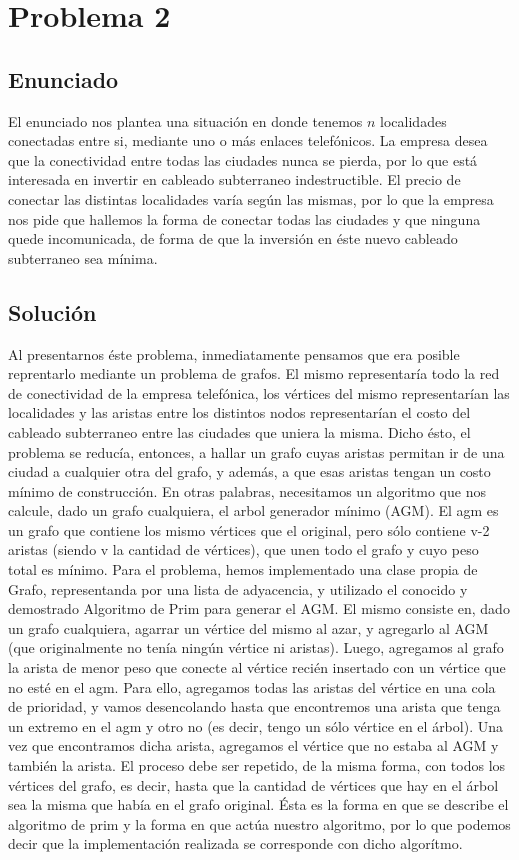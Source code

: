 \section{Problema 2}

\subsection{Enunciado}
El enunciado nos plantea una situación en donde tenemos $n$ localidades conectadas entre si, mediante uno o más enlaces telefónicos. La empresa desea que la conectividad entre todas las ciudades nunca se pierda, por lo que está interesada en invertir en cableado subterraneo indestructible. El precio de conectar las distintas localidades varía según las mismas, por lo que la empresa nos pide que hallemos la forma de conectar todas las ciudades y que ninguna quede incomunicada, de forma de que la inversión en éste nuevo cableado subterraneo sea mínima.

\subsection{Soluci\'on}
Al presentarnos éste problema, inmediatamente pensamos que era posible reprentarlo mediante un problema de grafos. El mismo representaría todo la red de conectividad de la empresa telefónica, los vértices del mismo representarían las localidades y las aristas entre los distintos nodos representarían el costo del cableado subterraneo entre las ciudades que uniera la misma.
Dicho ésto, el problema se reducía, entonces, a hallar un grafo cuyas aristas permitan ir de una ciudad a cualquier otra del grafo, y además, a que esas aristas tengan un costo mínimo de construcción. En otras palabras, necesitamos un algoritmo que nos calcule, dado un grafo cualquiera, el arbol generador mínimo (AGM). El agm es un grafo que contiene los mismo vértices que el original, pero sólo contiene v-2 aristas (siendo v la cantidad de vértices), que unen todo el grafo y cuyo peso total es mínimo.
Para el problema, hemos implementado una clase propia de Grafo, representanda por una lista de adyacencia, y utilizado el conocido y demostrado Algoritmo de Prim para generar el AGM. El mismo consiste en, dado un grafo cualquiera, agarrar un vértice del mismo al azar, y agregarlo al AGM (que originalmente no tenía ningún vértice ni aristas). Luego, agregamos al grafo la arista de menor peso que conecte al vértice recién insertado con un vértice que no esté en el agm. Para ello, agregamos todas las aristas del vértice en una cola de prioridad, y vamos desencolando hasta que encontremos una arista que tenga un extremo en el agm y otro no (es decir, tengo un sólo vértice en el árbol). Una vez que encontramos dicha arista, agregamos el vértice que no estaba al AGM y también la arista. El proceso debe ser repetido, de la misma forma, con todos los vértices del grafo, es decir, hasta que la cantidad de vértices que hay en el árbol sea la misma que había en el grafo original. Ésta es la forma en que se describe el algoritmo de prim y la forma en que actúa nuestro algoritmo, por lo que podemos decir que la implementación realizada se corresponde con dicho algorítmo.

